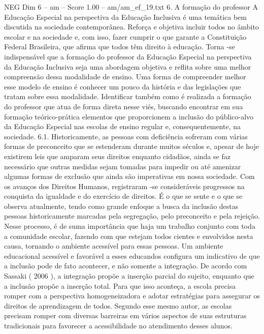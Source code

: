 \begin{textsample}{NEG Dim 6 – am – Score 1.00 – am/am\_ef\_19.txt}  \label{ex:f6_neg_024}
6.
A formação do professor A Educação Especial na perspectiva da Educação Inclusiva é uma temática bem discutida na sociedade contemporânea.
Reforça e objetiva incluir todos no âmbito escolar e na sociedade e, com isso, fazer cumprir o que garante a Constituição Federal Brasileira, que afirma que todos têm direito à educação.
Torna -se indispensável que a formação do professor da Educação Especial na perspectiva da Educação Inclusiva seja uma abordagem objetiva e reflita sobre uma melhor compreensão dessa modalidade de ensino.
Uma forma de compreender melhor esse modelo de ensino é conhecer um pouco da história e das legislações que tratam sobre essa modalidade.
Identificar também como é realizada a formação do professor que atua de forma direta nesse viés, buscando encontrar em sua formação teórico-prática elementos que proporcionem a inclusão do público-alvo da Educação Especial nas escolas de ensino regular e, consequentemente, na sociedade. 6.1.
Historicamente, as pessoas com deficiência sofreram com várias formas de preconceito que se estenderam durante muitos séculos e, apesar de hoje existirem leis que amparam seus direitos enquanto cidadãos, ainda se faz necessário que outras medidas sejam tomadas para impedir ou até amenizar algumas formas de exclusão que ainda são imperativas em nossa sociedade.
Com os avanços dos Direitos Humanos, registraram -se consideráveis progressos na conquista da igualdade e do exercício de direitos.
É o que se sente e o que se observa atualmente, tendo como grande enfoque a busca da inclusão destas pessoas historicamente marcadas pela segregação, pelo preconceito e pela rejeição.
Nesse processo, é de suma importância que haja um trabalho conjunto com toda a comunidade escolar, fazendo com que estejam todos cientes e envolvidos nesta causa, tornando o ambiente acessível para essas pessoas.
Um ambiente educacional acessível e favorável a esses educandos configura um indicativo de que a inclusão pode de fato acontecer, e não somente a integração.
De acordo com Sassaki ( 2006 ), a integração propõe a inserção parcial do sujeito, enquanto que a inclusão propõe a inserção total.
Para que isso aconteça, a escola precisa romper com a perspectiva homogeneizadora e adotar estratégias para assegurar os direitos de aprendizagem de todos.
Segundo esse mesmo autor, as escolas precisam romper com diversas barreiras em vários aspectos de suas estruturas tradicionais para favorecer a acessibilidade no atendimento desses alunos.

\end{textsample}
